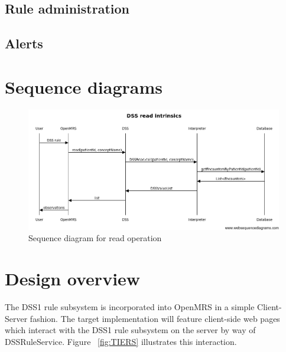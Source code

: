 \documentclass[12pt,letterpaper]{article}
\begin{document}
\subsection{Rule administration}

\subsection{Alerts}

\newpage 
\section{Sequence diagrams}

\begin{figure}\begin{center}
\includegraphics[width=6.5in]{readsequence.png}
\end{center}
\caption{Sequence diagram for read operation} 
\label{fig:SEQUENCE_READ}
\end{figure}


\newpage 
\section{Design overview} \label{sec:DESIGN_OVERVIEW}

	The DSS1 rule subsystem is incorporated into OpenMRS in a simple Client-Server fashion. The target implementation will feature client-side web pages which interact with the DSS1 rule subsystem on the server by way of DSSRuleService. Figure ~\ref{fig:TIERS} illustrates this interaction.
\end{document}

